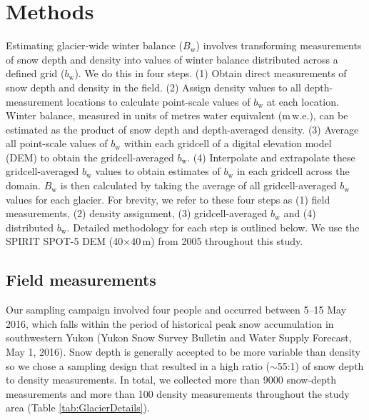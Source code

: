 \documentclass[review,oneside, letterpaper]{igs}
\begin{document}
\section{Methods}

Estimating glacier-wide winter balance ($B_\mathrm{w}$) involves transforming measurements of snow depth and density into values of winter balance distributed across a defined grid ($b_\mathrm{w}$). We do this in four steps. (1) Obtain direct measurements of snow depth and density in the field. (2) Assign density values to all depth-measurement locations to calculate point-scale values of $b_\mathrm{w}$ at each location. Winter balance, measured in units of metres water equivalent (m\,w.e.), can be estimated as the product of snow depth and depth-averaged density. (3) Average all point-scale values of $b_\mathrm{w}$ within each gridcell of a digital elevation model (DEM) to obtain the gridcell-averaged $b_\mathrm{w}$. (4) Interpolate and extrapolate these gridcell-averaged $b_\mathrm{w}$ values to obtain estimates of $b_\mathrm{w}$ in each gridcell across the domain. $B_\mathrm{w}$ is then calculated by taking the average of all gridcell-averaged $b_\mathrm{w}$ values for each glacier. For brevity, we refer to these four steps as (1) field measurements, (2) density assignment, (3) gridcell-averaged $b_\mathrm{w}$ and (4) distributed $b_\mathrm{w}$. Detailed methodology for each step is outlined below. We use the SPIRIT SPOT-5 DEM (40$\times$40\,m) from 2005 \citep{Korona2009} throughout this study. 

\subsection{Field measurements}

Our sampling campaign involved four people and occurred between 5--15 May 2016, which falls within the period of historical peak snow accumulation in southwestern Yukon (Yukon Snow Survey Bulletin and Water Supply Forecast, May 1, 2016). Snow depth is generally accepted to be more variable than density \citep{Elder1991, Clark2011, Lopez2013} so we chose a sampling design that resulted in a high ratio ($\sim$55:1) of snow depth to density measurements. In total, we collected more than 9000 snow-depth measurements and more than 100 density measurements throughout the study area (Table \ref {tab:GlacierDetails}).
\end{document}
